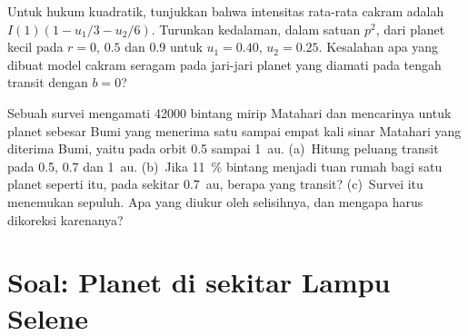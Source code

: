 \begin{exercise}[$\star\star\star$]\label{exo:b3:exoplanets:11}
Untuk hukum  kuadratik, tunjukkan bahwa intensitas rata-rata
cakram adalah $I(1)(1 - u_1/3 - u_2/6)$. Turunkan kedalaman, dalam satuan
$p^2$, dari planet kecil pada $r = 0$, $0.5$ dan $0.9$ untuk $u_1 = 0.40$,
$u_2 = 0.25$. Kesalahan apa yang dibuat model cakram seragam pada jari-jari
planet yang diamati pada tengah transit dengan $b = 0$?
\end{exercise}

\begin{exercise}[$\star\star\star$]\label{exo:b3:exoplanets:12}
Sebuah survei mengamati \num{42000} bintang mirip Matahari dan mencarinya untuk
planet sebesar Bumi yang menerima satu sampai empat kali sinar Matahari yang diterima Bumi,
yaitu pada orbit 0.5 sampai \qty{1}{au}. (a)~Hitung peluang transit
pada 0.5, 0.7 dan \qty{1}{au}. (b)~Jika \qty{11}{\percent} bintang menjadi tuan rumah
bagi satu planet seperti itu, pada sekitar \qty{0.7}{au}, berapa yang transit?
(c)~Survei itu menemukan sepuluh. Apa yang diukur oleh selisihnya, dan mengapa
 harus dikoreksi karenanya?
\end{exercise}

\section{Soal: Planet di sekitar Lampu Selene}

